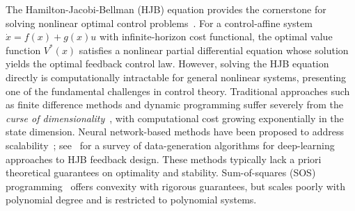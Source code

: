 \documentclass[11pt]{article}
\begin{document}
The Hamilton-Jacobi-Bellman (HJB) equation provides the cornerstone for solving nonlinear optimal control problems~\cite{bertsekas_dp}. For a control-affine system $\dot{x} = f(x) + g(x)u$ with infinite-horizon cost functional, the optimal value function $V^*(x)$ satisfies a nonlinear partial differential equation whose solution yields the optimal feedback control law. However, solving the HJB equation directly is computationally intractable for general nonlinear systems, presenting one of the fundamental challenges in control theory. Traditional approaches such as finite difference methods and dynamic programming suffer severely from the \emph{curse of dimensionality}~\cite{bertsekas_dp}, with computational cost growing exponentially in the state dimension. Neural network-based methods have been proposed to address scalability~\cite{hjb_rkhs}; see~\cite{kang_gong_nakamura_fahroo_survey} for a survey of data-generation algorithms for deep-learning approaches to HJB feedback design. These methods typically lack a priori theoretical guarantees on optimality and stability. Sum-of-squares (SOS) programming~\cite{parrilo_thesis, parrilo_sos} offers convexity with rigorous guarantees, but scales poorly with polynomial degree and is restricted to polynomial systems.
\end{document}
